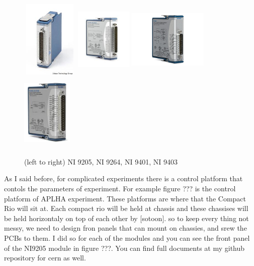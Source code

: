 \documentclass{article}
\begin{document}
\begin{figure}
\centering
\includegraphics[width=27mm, height=37mm]{ni9205}
\includegraphics[width=27mm, height=37mm]{ni9264}
\includegraphics[width=38mm, height=37mm]{ni9401}
\includegraphics[width=24mm, height=37mm]{ni9403}
\caption{(left to right) NI 9205, NI 9264, NI 9401, NI 9403}
\end{figure}

As I said before, for complicated experiments there is a control platform that contols the parameters of experiment. For example figure ??? is the control platform of APLHA experiment.
These platforms are where that the Compact Rio will sit at. Each compact rio will be held at chassis and these chassises will be held horizontaly on top of each other by [sotoon]. so to keep every thing not messy, we need to design fron panels that can mount on chassies, and srew the PCBs to them. I did so for each of the modules and you can see the front panel of the NI9205 module in figure ???. You can find full documents at my github repository for cern as well.
\end{document}
